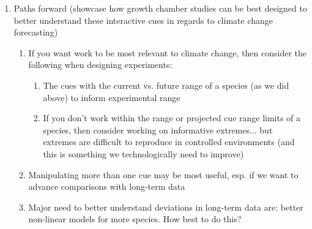 \documentclass[11pt,letterpaper]{article}
\begin{document}
\begin{enumerate}
\begin{enumerate}
\item Consider both the range of a species and the climate change projections ...
\begin{enumerate}
\item Take each PEP725 datapoint within our selected species' range and calculate:
\begin{enumerate}
\item Do we really have negative forcing in OSPREE? (See Fig. \ref{fig:pep})
\item Experiments have done a good job of testing chilling compared to climate change projections, covers full range and overshoots a bit ... (See Fig. \ref{fig:pep}) \footnote{We used daily min/max, as they're most directly comparable to OSPREE.}
\end{enumerate}
\end{enumerate}
\end{enumerate}
\item Paths forward (showcase how growth chamber studies can be best designed to better understand these interactive cues in regards to climate change forecasting) 
\begin{enumerate}
\item If you want work to be most relevant to climate change, then consider the following when designing experiments:
\begin{enumerate}
\item The cues with the current vs. future range of a species (as we did above) to inform experimental range %
\item If you don't work within the range or projected cue range limits of a species, then consider working on informative extremes... but extremes are difficult to reproduce in controlled environments (and this is something we technologically need to improve)
\end{enumerate}
\item Manipulating more than one cue may be most useful, esp. if we want to advance comparisons with long-term data
\item Major need to better understand deviations in long-term data are: better non-linear models for more species. How best to do this?

\end{enumerate}
\end{enumerate}
\end{document}
